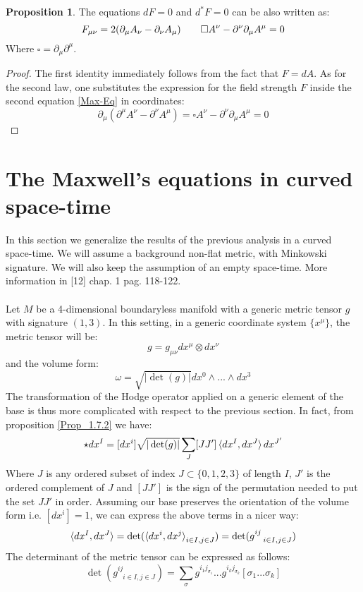 \documentclass[12pt,a4paper]{report}
\theoremstyle{definition}
\theoremstyle{Theorem}
\newtheorem{Prop}[Def]{Proposition}
\theoremstyle{definition}
\theoremstyle{definition}
\begin{document}
	\begin{Prop}
		The equations $dF=0$ and $d^*F=0$ can be also written as:
		$$F_{\mu\nu}=2(\partial_\mu A_\nu-\partial_\nu A_\mu)\hspace{20 pt}
		\square A^\nu-\partial^\nu\partial_\mu A^\mu=0$$
		Where $\square=\partial_\mu\partial^\mu$.
	\end{Prop}
	\begin{proof}
		The first identity immediately follows from the fact that $F=dA$. As for the second law, one substitutes the expression for the field strength $F$ inside the second equation \ref{Max-Eq} in coordinates:
		$$\partial_\mu(\partial^\mu A^\nu-\partial^\nu A^\mu)=\square A^\nu-\partial^\nu\partial_\mu A^\mu=0$$
	\end{proof}
	\section{The Maxwell's equations in curved space-time}
	In this section we generalize the results of the previous analysis in a curved space-time. We will assume a background non-flat metric, with Minkowski signature. We will also keep the assumption of an empty space-time. More information in [12] chap. 1 pag. 118-122.
	\\\\
	Let $M$ be a 4-dimensional boundaryless manifold with a generic metric tensor $g$ with signature $(1,3)$. In this setting, in a generic coordinate system $\{x^\mu\}$, the metric tensor will be:
	$$g=g_{\mu\nu}dx^\mu\otimes dx^\nu$$
	and the volume form:
	$$\omega=\sqrt{|\det(g)|}dx^0\wedge...\wedge dx^3$$
	The transformation of the Hodge operator applied on a generic element of the base is thus more complicated with respect to the previous section. In fact, from proposition \ref{Prop_1.7.2} we have:
	$$\star dx^I=[dx^i]\sqrt{|\det(g)|}\sum_J [JJ']\braket{dx^I,dx^J}dx^{J'}$$
	Where $J$ is any ordered subset of index $J\subset\{0,1,2,3\}$ of length $I$, $J'$ is the ordered complement of $J$ and $[JJ']$ is the sign of the permutation needed to put the set $JJ'$ in order.
	Assuming our base preserves the orientation of the volume form i.e. $[dx^i]=1$, we can express the above terms in a nicer way:
	$$\braket{dx^I,dx^J}=\det(\braket{dx^i,dx^j}_{i\in I,j\in J})=\det(g^{ij}_{\hspace{9pt}i\in I,j\in J})$$
	The determinant of the metric tensor can be expressed as follows:
	$$\det(g^{ij}_{\hspace{9pt}i\in I,j\in J})=\sum_\sigma g^{i_1j_{\sigma_1}}...g^{i_kj_{\sigma_k}}[\sigma_1...\sigma_k]$$
\end{document}
